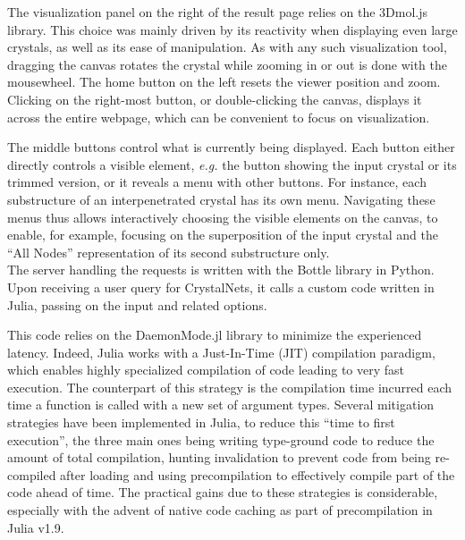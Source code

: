 \documentclass[main.tex]{subfiles}
\begin{document}


The visualization panel on the right of the result page relies on the 3Dmol.js library. This choice was mainly driven by its reactivity when displaying even large crystals, as well as its ease of manipulation. As with any such visualization tool, dragging the canvas rotates the crystal while zooming in or out is done with the mousewheel. The home button on the left resets the viewer position and zoom. Clicking on the right-most button, or double-clicking the canvas, displays it across the entire webpage, which can be convenient to focus on visualization.

The middle buttons control what is currently being displayed. Each button either directly controls a visible element, \textit{e.g.} the button showing the input crystal or its trimmed version, or it reveals a menu with other buttons. For instance, each substructure of an interpenetrated crystal has its own menu. Navigating these menus thus allows interactively choosing the visible elements on the canvas, to enable, for example, focusing on the superposition of the input crystal and the ``All Nodes'' representation of its second substructure only.\\


The server handling the requests is written with the Bottle library in Python. Upon receiving a user query for CrystalNets, it calls a custom code written in Julia, passing on the input and related options.

This code relies on the DaemonMode.jl library to minimize the experienced latency. Indeed, Julia works with a Just-In-Time (JIT) compilation paradigm, which enables highly specialized compilation of code leading to very fast execution. The counterpart of this strategy is the compilation time incurred each time a function is called with a new set of argument types. Several mitigation strategies have been implemented in Julia, to reduce this ``time to first execution'', the three main ones being writing type-ground code to reduce the amount of total compilation, hunting invalidation to prevent code from being re-compiled after loading and using precompilation to effectively compile part of the code ahead of time. The practical gains due to these strategies is considerable, especially with the advent of native code caching as part of precompilation in Julia v1.9.
\end{document}
